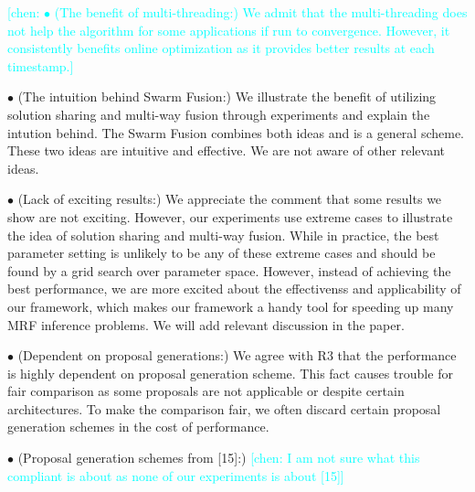 \documentclass[runningheads]{llncs}
\newcommand{\chen}[1]{\textcolor{cyan}{[chen: {#1}]}}
\begin{document}
\chen{\noindent $\bullet$ (The benefit of multi-threading:)
  We admit that the multi-threading does not help the
  algorithm for some applications if run to
  convergence. However, it consistently benefits online
  optimization as it provides better results at each
  timestamp.}
  
\vspace{0.15cm}

\noindent $\bullet$ (The intuition behind Swarm Fusion:) We
illustrate the benefit of utilizing solution sharing and
multi-way fusion through experiments and explain the
intution behind. The Swarm Fusion combines both ideas and is
a general scheme. These two ideas are intuitive and
effective. We are not aware of other relevant ideas.

\noindent $\bullet$ (Lack of exciting results:) We
appreciate the comment that some results we show are not
exciting. However, our experiments use extreme cases to
illustrate the idea of solution sharing and multi-way
fusion. While in practice, the best parameter setting is
unlikely to be any of these extreme cases and should be
found by a grid search over parameter space. However,
instead of achieving the best performance, we are more
excited about the effectivenss and applicability of our
framework, which makes our framework a handy tool for speeding up many
MRF inference problems. We will add relevant discussion in
the paper.

\noindent $\bullet$ (Dependent on proposal generations:) We
agree with R3 that the performance is highly dependent on
proposal generation scheme. This fact causes trouble for
fair comparison as some proposals are not applicable or
despite certain architectures. To make the comparison fair,
we often discard certain proposal generation schemes
in the cost of performance.

\noindent $\bullet$ (Proposal generation schemes from [15]:)
\chen{I am not sure what this compliant is about as none of
  our experiments is about [15]}
\end{document}
